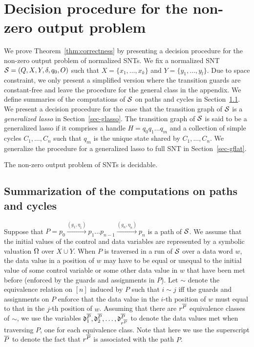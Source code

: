 
\section{Decision procedure for the non-zero output problem}\label{sec:dec-snt}
%
We prove Theorem~\ref{thm:correctness} by presenting a decision procedure for the non-zero output problem of normalized SNTs. We fix a normalized SNT ${\mathcal{S} } = (Q,X,Y,\delta,q_0,O)$ such that $X=\{ x_1,\dots, x_k\}$ and $Y = \{y_1,\dots,y_l\}$. Due to space constraint, we only present a simplified version where the transition guards are constant-free and leave the procedure for the general class in the appendix.
We define summaries of the computations of ${\mathcal{S} }$ on paths and cycles in Section~\ref{sec-sum}. We present a decision procedure for the case that the transition graph of ${\mathcal{S} }$ is a \emph{generalized lasso} in Section~\ref{sec-glasso}. The transition graph of ${\mathcal{S} }$ is said to be a generalized lasso if it comprises a handle $H=q_0 q_1 \dots q_m$ and a collection of simple cycles $C_1,\dots,C_n$ such that $q_m$ is the unique state shared by $C_1,\dots,C_n$. We generalize the procedure for a generalized lasso to full SNT in Section~\ref{sec-gflat}.

\begin{theorem}\label{thm:correctness}
The non-zero output problem of SNTs is decidable.
\end{theorem}


\subsection{Summarization of the computations on paths and cycles}\label{sec-sum}

Suppose that $P=p_0 \xrightarrow{(g_1,\eta_1)} p_1 \dots p_{n-1} \xrightarrow{(g_n,\eta_n)} p_{n}$ is a path of ${\mathcal{S} }$. We assume that the initial values of the control and data variables are represented by a symbolic valuation $\Omega$ over $X \cup Y$. When $P$ is traversed in a run of ${\mathcal{S} }$ over a data word $w$,  the data value in a position of $w$ may have to be equal or unequal to the initial value of some control variable or some other data value in $w$ that have been met before (enforced by the guards and assignments in $P$). Let $\sim$ denote the equivalence relation on $[n]$ induced by $P$ such that $i \sim j$ iff the guards and assignments on $P$ enforce that the data value in the $i$-th position of $w$ must equal to that in the $j$-th position of $w$. Assuming that there are $r^{\overline{P}}$ equivalence classes of $\sim$, we use the variables $\mathfrak{d}^{\overline{P}}_1,\mathfrak{d}^{\overline{P}}_2,\dots, \mathfrak{d}^{\overline{P}}_{r^{\overline{P}}}$ to denote the data values met when traversing $P$, one for each equivalence class. Note that here we use the superscript ${\overline{P}}$ to denote the fact that $r^{\overline{P}}$ is associated with the path $P$.

